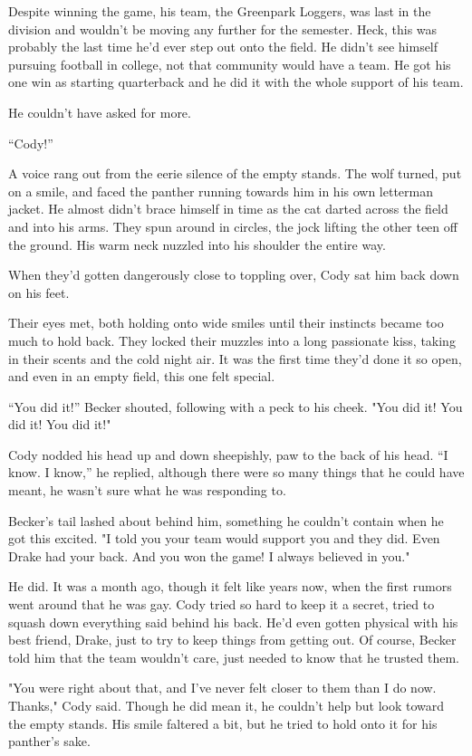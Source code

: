 Despite winning the game, his team, the Greenpark Loggers, was last in
the division and wouldn't be moving any further for the semester. Heck,
this was probably the last time he'd ever step out onto the field. He
didn't see himself pursuing football in college, not that community
would have a team. He got his one win as starting quarterback and he did
it with the whole support of his team.

He couldn't have asked for more.

``Cody!''

A voice rang out from the eerie silence of the empty stands. The wolf
turned, put on a smile, and faced the panther running towards him in his
own letterman jacket. He almost didn't brace himself in time as the cat
darted across the field and into his arms. They spun around in circles,
the jock lifting the other teen off the ground. His warm neck nuzzled
into his shoulder the entire way.

When they'd gotten dangerously close to toppling over, Cody sat him back
down on his feet.

Their eyes met, both holding onto wide smiles until their instincts
became too much to hold back. They locked their muzzles into a long
passionate kiss, taking in their scents and the cold night air. It was
the first time they'd done it so open, and even in an empty field, this
one felt special.

``You did it!'' Becker shouted, following with a peck to his cheek. "You
did it! You did it! You did it!"

Cody nodded his head up and down sheepishly, paw to the back of his
head. ``I know. I know,'' he replied, although there were so many things
that he could have meant, he wasn't sure what he was responding to.

Becker's tail lashed about behind him, something he couldn't contain
when he got this excited. "I told you your team would support you and
they did. Even Drake had your back. And you won the game! I always
believed in you."

He did. It was a month ago, though it felt like years now, when the
first rumors went around that he was gay. Cody tried so hard to keep it
a secret, tried to squash down everything said behind his back. He'd
even gotten physical with his best friend, Drake, just to try to keep
things from getting out. Of course, Becker told him that the team
wouldn't care, just needed to know that he trusted them.

"You were right about that, and I've never felt closer to them than I do
now. Thanks," Cody said. Though he did mean it, he couldn't help but
look toward the empty stands. His smile faltered a bit, but he tried to
hold onto it for his panther's sake.

